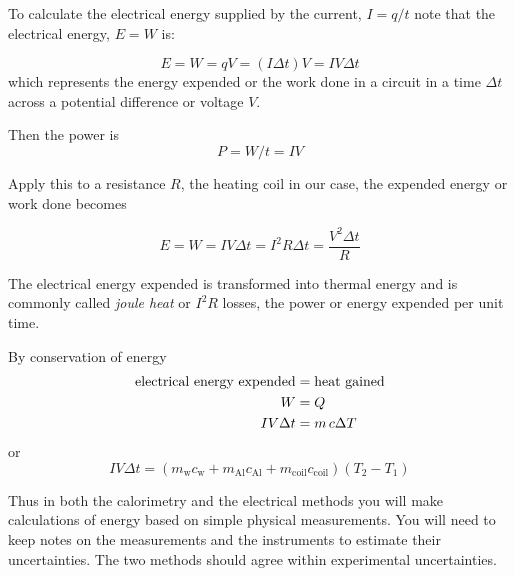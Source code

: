 To calculate the electrical energy supplied by the current, $I=q/t$ note that the electrical energy, $E = W$ is: %

\begin{equation}
	\label{e:iheat} E = W = qV = (I\Delta t)V = IV\Delta t
\end{equation}
which represents the energy expended or the work done in a circuit in a time  $\Delta t$ across a potential difference or voltage $V$.	


Then the power is 
\begin{equation}\label{e:power} P = W/t = IV \end{equation}

Apply this to a resistance $R$, the heating coil in our case, the expended energy or work done becomes

\begin{equation}\label{e:eWork} 
E = W = IV\Delta t = I^2R\Delta t = \frac{V^2\Delta t}{R} 
\end{equation}

The electrical energy expended is transformed into thermal energy and is commonly called \emph{joule heat} or $I^2 R$ losses, the power or energy expended per unit time.

By conservation of energy
\begin{align} 
\text{electrical energy expended} & = \text{heat gained} \notag \\
W & = Q \notag \\
IV\Delta t & = m\,c\Delta T \notag
\end{align}
or
\begin{equation}
IV\Delta t = \left(m_{\textrm{w}}c_{\textrm{w}} + m_{\textrm{Al}}c_{\textrm{Al}} + m_{\textrm{coil}}c_{\textrm{coil}}\right)\left(T_2 - T_1\right)
\end{equation}

Thus in both the calorimetry and the electrical methods you will make calculations of energy based on simple physical measurements.  You will need to keep notes on the measurements and the instruments to estimate their uncertainties.  The two methods should agree within experimental uncertainties.

